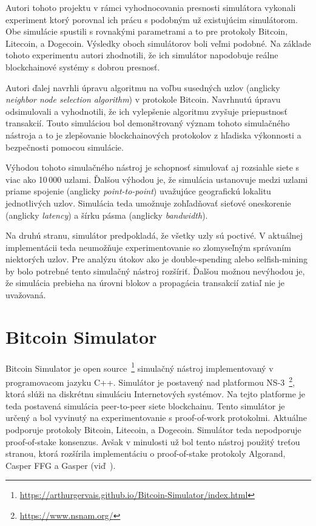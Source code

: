 Autori tohoto projektu v rámci vyhodnocovania presnosti simulátora vykonali experiment ktorý porovnal ich prácu s podobným už existujúcim simulátorom. Obe simulácie spustili s rovnakými parametrami a to pre protokoly Bitcoin, Litecoin, a Dogecoin. Výsledky oboch simulátorov boli veľmi podobné. Na základe tohoto experimentu autori zhodnotili, že ich simulátor napodobuje reálne blockchainové systémy s dobrou presnosť.

Autori ďalej navrhli úpravu algoritmu na voľbu susedných uzlov (anglicky \textit{neighbor node selection algorithm}) v protokole Bitcoin. Navrhnutú úpravu odsimulovali a vyhodnotili, že ich vylepšenie algoritmu zvyšuje priepustnosť transakcií. Touto simuláciou bol demonštrovaný význam tohoto simulačného nástroja a to je zlepšovanie blockchainových protokolov z hľadiska výkonnosti a bezpečnosti pomocou simulácie.~\cite{simblockWp}

Výhodou tohoto simulačného nástroj je schopnosť simulovať aj rozsiahle siete s viac ako 10\,000 uzlami. Ďalšou výhodou je, že simulácia ustanovuje medzi uzlami priame spojenie (anglicky \textit{point-to-point}) uvažujúce geografickú lokalitu jednotlivých uzlov. Simulácia teda umožnuje zohľadňovať sieťové oneskorenie (anglicky \textit{latency}) a šírku pásma (anglicky \textit{bandwidth}). 

Na druhú stranu, simulátor predpokladá, že všetky uzly sú poctivé. V aktuálnej implementácii teda neumožňuje experimentovanie so zlomyseľným správaním niektorých uzlov. Pre analýzu útokov ako je double-spending alebo selfish-mining by bolo potrebné tento simulačný nástroj rozšíriť. Ďalšou možnou nevýhodou je, že simulácia prebieha na úrovni blokov a propagácia transakcií zatiaľ nie je uvažovaná.~\cite{fanPerfEval}

\section{Bitcoin Simulator}

Bitcoin Simulator je open source~\footnote{\url{https://arthurgervais.github.io/Bitcoin-Simulator/index.html}} simulačný nástroj implementovaný v programovacom jazyku C++. Simulátor je postavený nad platformou NS-3~\footnote{\url{https://www.nsnam.org/}}, ktorá slúži na diskrétnu simuláciu Internetových systémov. Na tejto platforme je teda postavená simulácia peer-to-peer siete blockchainu. Tento simulátor je určený a bol vyvinutý na experimentovanie s proof-of-work protokolmi. Aktuálne podporuje protokoly Bitcoin, Litecoin, a Dogecoin. Simulátor teda nepodporuje proof-of-stake konsenzus. Avšak v minulosti už bol tento nástroj použitý treťou stranou, ktorá rozšírila implementáciu o proof-of-stake protokoly Algorand, Casper FFG a Gasper (viď~\cite{borcikDp}). 


